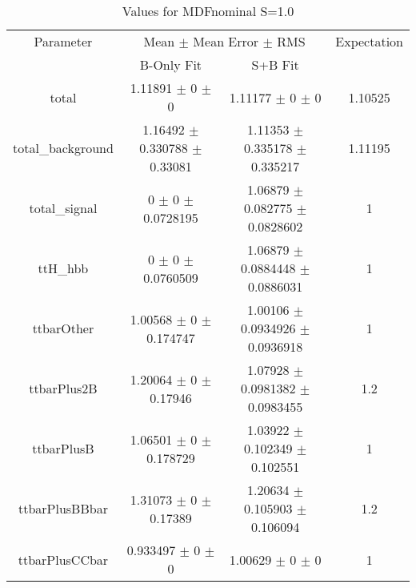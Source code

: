 \begin{table}
\centering
\caption{Values for MDFnominal S=1.0}
\begin{tabular}{cccc}
\toprule
Parameter & \multicolumn{2}{c}{Mean $\pm$ Mean Error $\pm$ RMS} & Expectation\\
 & B-Only Fit & S+B Fit & \\
\midrule
total & \num{1.11891} $\pm$ \num{0} $\pm$ \num{0} & \num{1.11177} $\pm$ \num{0} $\pm$ \num{0} & \num{1.10525}\\
total\_background & \num{1.16492} $\pm$ \num{0.330788} $\pm$ \num{0.33081} & \num{1.11353} $\pm$ \num{0.335178} $\pm$ \num{0.335217} & \num{1.11195}\\
total\_signal & \num{0} $\pm$ \num{0} $\pm$ \num{0.0728195} & \num{1.06879} $\pm$ \num{0.082775} $\pm$ \num{0.0828602} & \num{1}\\
ttH\_hbb & \num{0} $\pm$ \num{0} $\pm$ \num{0.0760509} & \num{1.06879} $\pm$ \num{0.0884448} $\pm$ \num{0.0886031} & \num{1}\\
ttbarOther & \num{1.00568} $\pm$ \num{0} $\pm$ \num{0.174747} & \num{1.00106} $\pm$ \num{0.0934926} $\pm$ \num{0.0936918} & \num{1}\\
ttbarPlus2B & \num{1.20064} $\pm$ \num{0} $\pm$ \num{0.17946} & \num{1.07928} $\pm$ \num{0.0981382} $\pm$ \num{0.0983455} & \num{1.2}\\
ttbarPlusB & \num{1.06501} $\pm$ \num{0} $\pm$ \num{0.178729} & \num{1.03922} $\pm$ \num{0.102349} $\pm$ \num{0.102551} & \num{1}\\
ttbarPlusBBbar & \num{1.31073} $\pm$ \num{0} $\pm$ \num{0.17389} & \num{1.20634} $\pm$ \num{0.105903} $\pm$ \num{0.106094} & \num{1.2}\\
ttbarPlusCCbar & \num{0.933497} $\pm$ \num{0} $\pm$ \num{0} & \num{1.00629} $\pm$ \num{0} $\pm$ \num{0} & \num{1}\\
\bottomrule
\end{tabular}
\end{table}